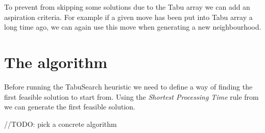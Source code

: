 \documentclass[14pt]{article}
\begin{document}
To prevent from skipping some solutions due to the Tabu array we can add an aspiration criteria. For example if a given move has been put into Tabu array a long time ago, we can again use this move when generating a new neighbourhood.

\section{The algorithm}

Before running the TabuSearch heuristic we need to define a way of finding the first feasible solution to start from.
Using the \textit{Shortest Processing Time} rule from \citet[section 2.1]{brandimarte} we can generate the first feasible solution.

\begin{algorithm}[H]
  \begin{algorithmic}[1]
    \State //TODO: pick a concrete algorithm
  \end{algorithmic}
\end{algorithm}



\end{document}
